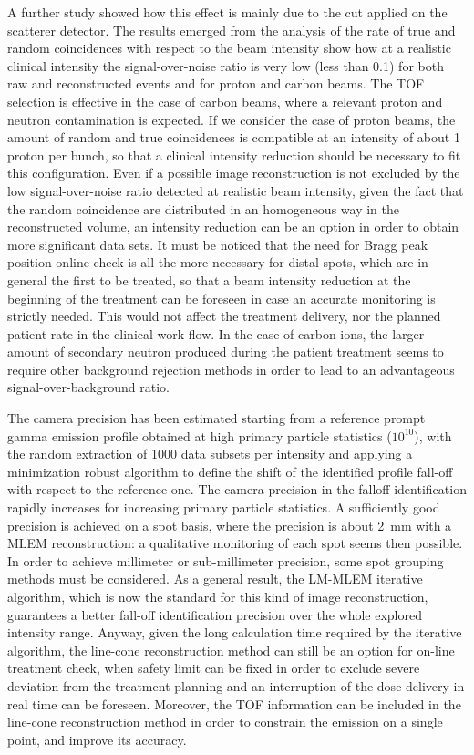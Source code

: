 A further study showed how this effect is mainly due to the cut applied on the scatterer detector. 
The results emerged from the analysis of the rate of true and random coincidences with respect to the beam intensity show how at a realistic clinical intensity the signal-over-noise ratio is very low (less than 0.1) for both raw and reconstructed events and for proton and carbon beams. The TOF selection is effective in the case of carbon beams, where a relevant proton and neutron contamination is expected. If we consider the case of proton beams, the amount of random and true coincidences is compatible at an intensity of about 1 proton per bunch, so that a clinical intensity reduction should be necessary to fit this configuration. Even if a possible image reconstruction is not excluded by the low signal-over-noise ratio detected at realistic beam intensity, given the fact that the random coincidence are distributed in an homogeneous way in the reconstructed volume, an intensity reduction can be an option in order to obtain more significant data sets. It must be noticed that the need for Bragg peak position online check is all the more necessary for distal spots, which are in general the first to be treated, so that a beam intensity reduction at the beginning of the treatment can be foreseen in case an accurate monitoring is strictly needed. This would not affect the treatment delivery, nor the planned patient rate in the clinical work-flow. 
In the case of carbon ions, the larger amount of secondary neutron produced during the patient treatment seems to require other background rejection methods in order to lead to an advantageous signal-over-background ratio.

The camera precision has been estimated starting from a reference prompt gamma emission profile obtained at high primary particle statistics ($10^{10}$), with the random extraction of 1000 data subsets per intensity and applying a minimization robust algorithm to define the shift of the identified profile fall-off with respect to the reference one.
The camera precision in the falloff identification rapidly increases for increasing primary particle statistics. A sufficiently good precision is achieved on a spot basis, where the precision is about 2~mm with a MLEM reconstruction: a qualitative monitoring of each spot seems then possible. In order to achieve millimeter or sub-millimeter precision, some spot grouping methods must be considered. As a general result, the LM-MLEM iterative algorithm, which is now the standard for this kind of image reconstruction,  guarantees a better fall-off identification precision over the whole explored intensity range. Anyway, given the long calculation time required by the iterative algorithm, the line-cone reconstruction method can still be an option for on-line treatment check, when safety limit can be fixed in order to exclude severe deviation from the treatment planning and an interruption of the dose delivery in real time can be foreseen. Moreover, the TOF information can be included in the line-cone reconstruction method in order to constrain the emission on a single point, and improve its accuracy.

